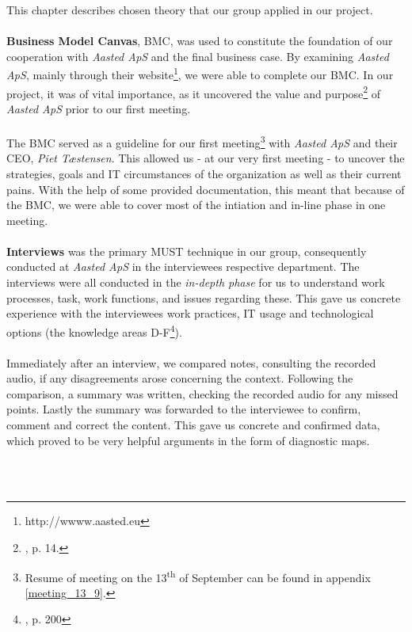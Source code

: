 This chapter describes chosen theory that our group applied in our project.
\\\\
\textbf{Business Model Canvas}, BMC, was used to constitute the foundation of our cooperation with \textit{Aasted ApS} and the final business case. By examining \textit{Aasted ApS}, mainly through their website\footnote{http://wwww.aasted.eu}, we were able to complete our BMC. In our project, it was of vital importance, as it uncovered the value and purpose\footnote{\cite{osterwalder}, p. 14.} of \textit{Aasted ApS} prior to our first meeting.
\\\\
The BMC served as a guideline for our first meeting\footnote{Resume of meeting on the 13\textsuperscript{th} of September can be found in appendix \ref{meeting_13_9}.} with \textit{Aasted ApS} and their CEO, \textit{Piet Tæstensen}. This allowed us - at our very first meeting - to uncover the strategies, goals and IT circumstances of the organization as well as their current pains. With the help of some provided documentation, this meant that because of the BMC, we were able to cover most of the intiation and in-line phase in one meeting.
\\\\
\textbf{Interviews} was the primary MUST technique in our group, consequently conducted at \textit{Aasted ApS} in the interviewees respective department. The interviews were all conducted in the \textit{in-depth phase} for us to understand work processes, task, work functions, and issues regarding these. This gave us concrete experience with the interviewees work practices, IT usage and technological options (the knowledge areas D-F\footnote{\cite{boedker}, p. 200}).
\\\\
Immediately after an interview, we compared notes, consulting the recorded audio, if any disagreements arose concerning the context. Following the comparison, a summary was written, checking the recorded audio for any missed points. Lastly the summary was forwarded to the interviewee to confirm, comment and correct the content. This gave us concrete and confirmed data, which proved to be very helpful arguments in the form of diagnostic maps.
\iffalse
Our instant documentation and analysis of data forced us to examine and evaluate the data, while it was still fresh in our memory, allowing us to easily formulate future questions and actions with the \textit{Aasted ApS}.
\fi
\\\\
